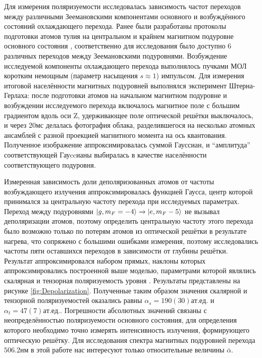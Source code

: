 Для измерения поляризуемости исследовалась зависимость частот переходов между различными Зеемановскими компонентами основного и возбуждённого состояний охлаждающего перехода. 
Ранее были разработаны протоколы подготовки атомов тулия на центральном и крайнем магнитном подуровне основного состояния \cite{}, соответственно для исследования было доступно 6 различных переходов между Зеемановскими подуровнями. 
Возбуждение исследуемой компоненты охлаждающего перехода выполнялось пучками МОЛ коротким немощным (параметр насыщения $s\approx1$) импульсом.
Для измерения итоговой населённости магнитных подуровней выполнялся эксперимент Штерна-Герлаха: после подготовки атомов на начальном магнитном подуровне и возбуждении исследуемого перехода включалось магнитное поле с большим градиентом вдоль оси Z, удерживающее поле оптической решётки выключалось, и через $20\unit{мс}$ делалась фотография облака, разделившегося на несколько атомных ансамблей с разной проекцией магнитного момента на ось квантования.
Полученное изображение аппроксимировалась суммой Гауссиан, и ``амплитуда'' соответствующей Гауccианы выбиралась в качестве населённости соответствующего подуровня.


Измеренная зависимость доли деполяризованных атомов от частоты возбуждающего излучения аппроксимировалась функцией Гаусса, центр которой принимался за центральную частоту перехода при исследуемых параметрах. 
Переход между подуровнями $\ket{g, m_F = -4} \xrightarrow{} \ket{e, m_F-5}$ не вызывал деполяризации атомов, поэтому определить центральную частоту этого перехода было возможно только по потерям атомов из оптической решётки в результате нагрева, что сопряжено с большими ошибками измерения, поэтому исследовались частоты пяти оставшихся переходов в зависимости от глубины решётки. 
Результат аппроксимировался набором прямых, наклоны которых аппроксимировались построенной выше моделью, параметрами которой являлись скалярная и тензорная поляризуемость уровня .
Результаты представлены на рисунке \ref{fig:Depolarization}.
Полученные таким образом значения скалярной и тензорной поляризуемостей оказались равны $\alpha_s = 190(30)\unit{ат.ед.}$ и $\alpha_t = 47(7)\unit{ат.ед.}$.
Погрешности абсолютных значений связаны с неопределённостью поляризуемости основного состояния, для определения которого необходимо точно измерять интенсивность излучения, формирующего оптическую решётку.
Для исследования спектра магнитных подуровней перехода $506.2\unit{нм}$ в этой работе нас интересуют только относительные величины $\bar{\alpha}$.

